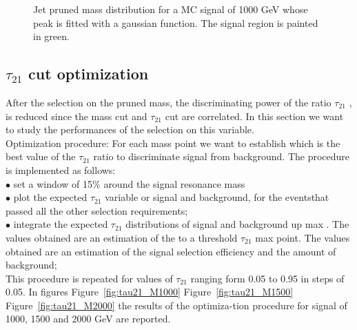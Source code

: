 \documentclass[12pt]{article} %
\begin{document}
\begin{figure}[H] %
  \caption{Jet pruned mass distribution for a MC signal of 1000 GeV whose peak is fitted with a gaussian function. The signal region is painted in green.}
  \label{fig:fitZpMass}
\end{figure}



\subsection{$\tau_{21}$ cut optimization} %

After the selection on the pruned mass, the discriminating power of the ratio $\tau_{21}$ , is reduced since the mass cut and $\tau_{21}$ cut are correlated. In this section we want to study the performances of the selection on this variable.
\\
Optimization procedure: For each mass point we want to establish which is the best value of the $\tau_{21}$ ratio to discriminate signal from background. The procedure is implemented as follows:
\\
\noindent
$\bullet$ set a window of 15\% around the signal resonance mass \\
$\bullet$ plot the expected $\tau_{21}$  variable or signal and background, for the eventsthat passed all the other selection requirements; \\
$\bullet$ integrate the expected $\tau_{21}$ distributions of signal and background up max . The values obtained are an estimation of the to a threshold $\tau_{21}$ max point. The values obtained are an estimation of the signal selection efficiency and the amount of background; \\
This procedure is repeated for values of $\tau_{21}$ ranging form 0.05 to 0.95 in steps of 0.05. In figures Figure~\ref{fig:tau21_M1000} Figure~\ref{fig:tau21_M1500} Figure~\ref{fig:tau21_M2000} the results of the optimiza-tion procedure for signal of 1000, 1500 and 2000 GeV are reported.
\end{document}
